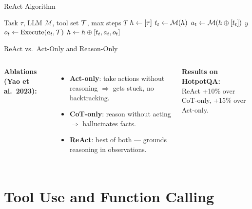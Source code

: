 \documentclass[aspectratio=169,10pt]{beamer}
\begin{document}
\begin{frame}{ReAct Algorithm}
  \begin{algorithm}[H]
    \caption{ReAct Agent Loop}
    \begin{algorithmic}[1]
      \Require Task $\tau$, LLM $\mathcal{M}$, tool set $\mathcal{T}$, max steps $T$
      \State $h \gets [\tau]$
        \State $t_t \gets \mathcal{M}(h)$ 
        \State $a_t \gets \mathcal{M}(h \oplus [t_t])$ 
          \Return $y$
        \EndIf
        \State $o_t \gets \text{Execute}(a_t, \mathcal{T})$ 
        \State $h \gets h \oplus [t_t, a_t, o_t]$
      \EndFor
      \Return {}
    \end{algorithmic}
  \end{algorithm}
\end{frame}

\begin{frame}{ReAct vs.\ Act-Only and Reason-Only}
  \begin{columns}[T]
      \textbf{Ablations (Yao et al.\ 2023):}
      \begin{itemize}
        \item \textbf{Act-only}: take actions without reasoning $\Rightarrow$ gets stuck, no backtracking.
        \item \textbf{CoT-only}: reason without acting $\Rightarrow$ hallucinates facts.
        \item \textbf{ReAct}: best of both — grounds reasoning in observations.
      \end{itemize}
      \vspace{0.4em}
      \textbf{Results on HotpotQA:}\\
      ReAct +10\% over CoT-only, +15\% over Act-only.
  \end{columns}
\end{frame}

\section{Tool Use and Function Calling}
\end{document}
